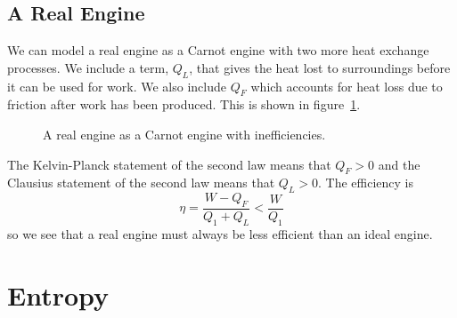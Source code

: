 \documentclass[a4paper]{article}
\begin{document}
    \subsection{A Real Engine}
    We can model a real engine as a Carnot engine with two more heat exchange processes.
    We include a term, \(Q_L\), that gives the heat lost to surroundings before it can be used for work.
    We also include \(Q_F\) which accounts for heat loss due to friction after work has been produced.
    This is shown in figure~\ref{fig:real engine}.
    \begin{figure}[ht]
        \centering
        \caption{A real engine as a Carnot engine with inefficiencies.}
        \label{fig:real engine}
    \end{figure}
    The Kelvin-Planck statement of the second law means that \(Q_F > 0\) and the Clausius statement of the second law means that \(Q_L > 0\).
    The efficiency is
    \[\eta = \frac{W - Q_F}{Q_1 + Q_L} < \frac{W}{Q_1}\]
    so we see that a real engine must always be less efficient than an ideal engine.
    
    \section{Entropy}
\end{document}
